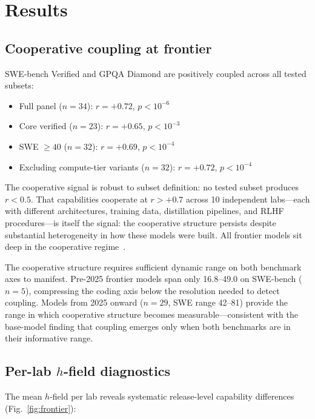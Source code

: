 \documentclass{article}
\begin{document}
\section{Results}
\label{sec:results}

\subsection{Cooperative coupling at frontier}

SWE-bench Verified and GPQA Diamond are positively coupled across all tested subsets:
\begin{itemize}[nosep,leftmargin=*]
  \item Full panel ($n = 34$): $r = +0.72$, $p < 10^{-6}$
  \item Core verified ($n = 23$): $r = +0.65$, $p < 10^{-3}$
  \item SWE $\geq 40$ ($n = 32$): $r = +0.69$, $p < 10^{-4}$
  \item Excluding compute-tier variants ($n = 32$): $r = +0.72$, $p < 10^{-4}$
\end{itemize}
The cooperative signal is robust to subset definition:
no tested subset produces $r < 0.5$.
That capabilities cooperate at $r > +0.7$ across 10 independent labs---each
with different architectures, training data, distillation pipelines,
and RLHF procedures---is itself the signal:
the cooperative structure persists despite substantial heterogeneity
in how these models were built.
All frontier models sit deep in the cooperative regime~\cite{amin2026lying}.

The cooperative structure requires sufficient dynamic range on both benchmark axes
to manifest.
Pre-2025 frontier models span only 16.8--49.0 on SWE-bench ($n = 5$),
compressing the coding axis below the resolution needed to detect coupling.
Models from 2025 onward ($n = 29$, SWE range 42--81) provide
the range in which cooperative structure becomes measurable---consistent
with the base-model finding that coupling emerges only when both
benchmarks are in their informative range.

\subsection{Per-lab \texorpdfstring{$h$}{h}-field diagnostics}

The mean $h$-field per lab reveals systematic release-level capability differences (Fig.~\ref{fig:frontier}):
\end{document}
